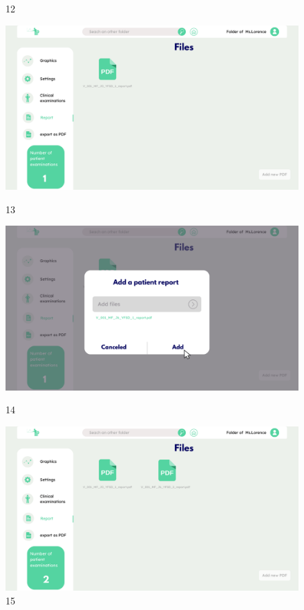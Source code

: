 \begin{figure}[H]
\begin{minipage}{0.3\textwidth}
        \caption*{12}
    \end{minipage}
    \begin{minipage}{0.3\textwidth}
        \centering
        \includegraphics[width=\textwidth]{images/Prototype/13.png}
        \caption*{13}
    \end{minipage}
    \begin{minipage}{0.3\textwidth}
        \centering
        \includegraphics[width=\textwidth]{images/Prototype/14.png}
        \caption*{14}
    \end{minipage}
    \begin{minipage}{0.3\textwidth}
        \centering
        \includegraphics[width=\textwidth]{images/Prototype/15.png}
        \caption*{15}
    \end{minipage}
    \label{fig:plateforme_imaginee}
\end{figure}